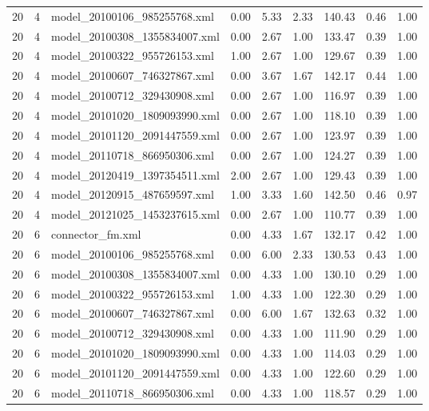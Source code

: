 \begin{table}[ht]
\begin{tabular}{rrlrrrrrr}
   20 &   4 & model\_20100106\_985255768.xml & 0.00 & 5.33 & 2.33 & 140.43 & 0.46 & 1.00 \\ 
   20 &   4 & model\_20100308\_1355834007.xml & 0.00 & 2.67 & 1.00 & 133.47 & 0.39 & 1.00 \\ 
   20 &   4 & model\_20100322\_955726153.xml & 1.00 & 2.67 & 1.00 & 129.67 & 0.39 & 1.00 \\ 
   20 &   4 & model\_20100607\_746327867.xml & 0.00 & 3.67 & 1.67 & 142.17 & 0.44 & 1.00 \\ 
   20 &   4 & model\_20100712\_329430908.xml & 0.00 & 2.67 & 1.00 & 116.97 & 0.39 & 1.00 \\ 
   20 &   4 & model\_20101020\_1809093990.xml & 0.00 & 2.67 & 1.00 & 118.10 & 0.39 & 1.00 \\ 
   20 &   4 & model\_20101120\_2091447559.xml & 0.00 & 2.67 & 1.00 & 123.97 & 0.39 & 1.00 \\ 
   20 &   4 & model\_20110718\_866950306.xml & 0.00 & 2.67 & 1.00 & 124.27 & 0.39 & 1.00 \\ 
   20 &   4 & model\_20120419\_1397354511.xml & 2.00 & 2.67 & 1.00 & 129.43 & 0.39 & 1.00 \\ 
   20 &   4 & model\_20120915\_487659597.xml & 1.00 & 3.33 & 1.60 & 142.50 & 0.46 & 0.97 \\ 
   20 &   4 & model\_20121025\_1453237615.xml & 0.00 & 2.67 & 1.00 & 110.77 & 0.39 & 1.00 \\ 
   20 &   6 & connector\_fm.xml & 0.00 & 4.33 & 1.67 & 132.17 & 0.42 & 1.00 \\ 
   20 &   6 & model\_20100106\_985255768.xml & 0.00 & 6.00 & 2.33 & 130.53 & 0.43 & 1.00 \\ 
   20 &   6 & model\_20100308\_1355834007.xml & 0.00 & 4.33 & 1.00 & 130.10 & 0.29 & 1.00 \\ 
   20 &   6 & model\_20100322\_955726153.xml & 1.00 & 4.33 & 1.00 & 122.30 & 0.29 & 1.00 \\ 
   20 &   6 & model\_20100607\_746327867.xml & 0.00 & 6.00 & 1.67 & 132.63 & 0.32 & 1.00 \\ 
   20 &   6 & model\_20100712\_329430908.xml & 0.00 & 4.33 & 1.00 & 111.90 & 0.29 & 1.00 \\ 
   20 &   6 & model\_20101020\_1809093990.xml & 0.00 & 4.33 & 1.00 & 114.03 & 0.29 & 1.00 \\ 
   20 &   6 & model\_20101120\_2091447559.xml & 0.00 & 4.33 & 1.00 & 122.60 & 0.29 & 1.00 \\ 
   20 &   6 & model\_20110718\_866950306.xml & 0.00 & 4.33 & 1.00 & 118.57 & 0.29 & 1.00 \\ 

\end{tabular}
\end{table}
